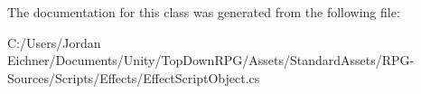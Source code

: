 The documentation for this class was generated from the following file\+:\begin{DoxyCompactItemize}
\item 
C\+:/\+Users/\+Jordan Eichner/\+Documents/\+Unity/\+Top\+Down\+R\+P\+G/\+Assets/\+Standard\+Assets/\+R\+P\+G-\/\+Sources/\+Scripts/\+Effects/Effect\+Script\+Object.\+cs\end{DoxyCompactItemize}
